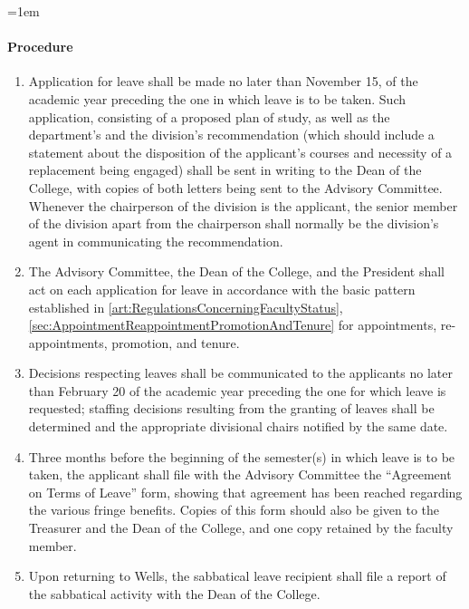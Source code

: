 \documentclass{manual}
\let\oldparagraph\paragraph
\renewcommand\paragraph{\leftskip=1em\oldparagraph}
\newcommand{\itemLevelA}{\alph*.}
\newcommand{\itemRefA}{\alph*}
\begin{document}
\paragraph{Procedure}
\begin{enumerate}[label=\itemLevelA,ref=\itemRefA]
\item Application for leave shall be made no later than November 15, of the academic year preceding the one in which leave is to be taken. Such application, consisting of a proposed plan of study, as well as the department's and the division's recommendation (which should include a statement about the disposition of the applicant's courses and necessity of a replacement being engaged) shall be sent in writing to the Dean of the College, with copies of both letters being sent to the Advisory Committee. Whenever the chairperson of the division is the applicant, the senior member of the division apart from the chairperson shall normally be the division's agent in communicating the recommendation.

\item The Advisory Committee, the Dean of the College, and the President shall act on each application for leave in accordance with the basic pattern established in \cref{art:RegulationsConcerningFacultyStatus}, \cref{sec:AppointmentReappointmentPromotionAndTenure} for appointments, re- appointments, promotion, and tenure.

\item Decisions respecting leaves shall be communicated to the applicants no later than February 20 of the academic year preceding the one for which leave is requested; staffing decisions resulting from the granting of leaves shall be determined and the appropriate divisional chairs notified by the same date.

\item Three months before the beginning of the semester(s) in which leave is to be taken, the applicant shall file with the Advisory Committee the ``Agreement on Terms of Leave'' form, showing that agreement has been reached regarding the various fringe benefits. Copies of this form should also be given to the Treasurer and the Dean of the College, and one copy retained by the faculty member.

\item Upon returning to Wells, the sabbatical leave recipient shall file a report of the sabbatical activity with the Dean of the College.
\end{enumerate}
\end{document}
